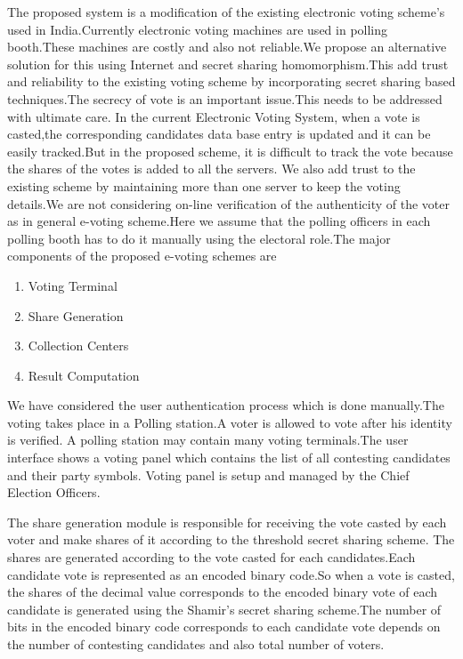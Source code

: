 \documentclass[conference]{IEEEtran}
\begin{document}
The proposed system is a modification of the existing electronic voting scheme's used in India.Currently electronic voting machines are used in polling booth.These machines are costly and also not reliable.We propose an alternative solution for this using Internet and secret sharing homomorphism.This add trust and reliability to the existing voting scheme by incorporating secret sharing based techniques.The secrecy of vote is an important issue.This needs to be addressed with ultimate care. In the current Electronic Voting System, when a vote is casted,the corresponding candidates data base entry is updated and it can be easily tracked.But in the proposed scheme, it is difficult to track the vote because the shares of the votes is added to all the servers. We also add trust to the existing scheme by maintaining more than one server to keep the voting details.We are not considering on-line verification of the authenticity of the voter as in general e-voting scheme.Here we assume that the polling officers in each polling booth has to do it manually using the electoral role.The major components of the proposed e-voting schemes are
\begin{enumerate}
	\item Voting Terminal
	\item Share Generation 
	\item Collection Centers
	\item Result Computation
\end{enumerate}

We have considered the user authentication process which is done manually.The voting takes place in a Polling station.A voter is allowed to vote after his identity is verified. A polling station may contain many voting terminals.The user interface shows a voting panel which contains the list of all contesting candidates and their party symbols. Voting panel is setup and managed by the Chief Election Officers.

The share generation module is responsible for receiving the vote casted by each voter and make shares of it according to the threshold secret sharing scheme.
The shares are generated according to the vote casted for each candidates.Each candidate vote is represented as an encoded binary code.So when a vote is casted, the shares of the decimal value corresponds to the encoded binary vote of each candidate is generated using the Shamir's secret sharing scheme.The number of bits in the encoded binary code corresponds to each candidate vote depends on the number of contesting candidates and also total number of voters.
\end{document}
